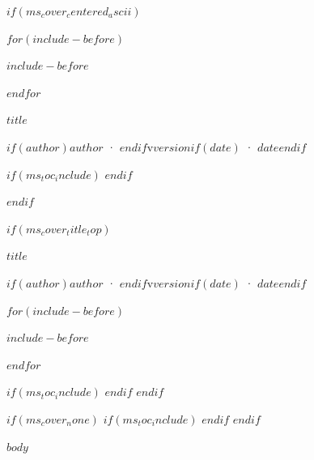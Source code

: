 \documentclass[10pt,a4paper]{article}
\newcounter{none}
\begin{document}
$if(ms_cover_centered_ascii)$
\thispagestyle{firstpage}
\null\vfill

$for(include-before)$
\begin{center}
\begin{varwidth}{\textwidth}
$include-before$
\end{varwidth}
\end{center}
$endfor$

\vfill

{\fontsize{\msfontcovertitle}{\msfontcovertitlelh}\selectfont\bfseries $title$\par}
{\fontsize{\msfontcovermeta}{\msfontcovermetalh}\selectfont\color{textsecondary}%
$if(author)$$author$ · $endif$v$version$$if(date)$ · $date$$endif$\par}

$if(ms_toc_include)$
\tableofcontents
\thispagestyle{firstpage}
$endif$

\vspace{6em}
\newpage
$endif$

$if(ms_cover_title_top)$
\thispagestyle{firstpage}
{\fontsize{\msfontcovertitle}{\msfontcovertitlelh}\selectfont\bfseries $title$\par}
\vspace{\msspacemd}
{\fontsize{\msfontcovermeta}{\msfontcovermetalh}\selectfont\color{textsecondary}%
$if(author)$$author$ · $endif$v$version$$if(date)$ · $date$$endif$\par}

\vspace{\msspacexl}

$for(include-before)$
\begin{varwidth}{\textwidth}
$include-before$
\end{varwidth}
$endfor$

\vfill

$if(ms_toc_include)$
\tableofcontents
\thispagestyle{firstpage}
$endif$
\newpage
$endif$

$if(ms_cover_none)$
$if(ms_toc_include)$
\tableofcontents
\newpage
$endif$
$endif$

$body$
\end{document}
